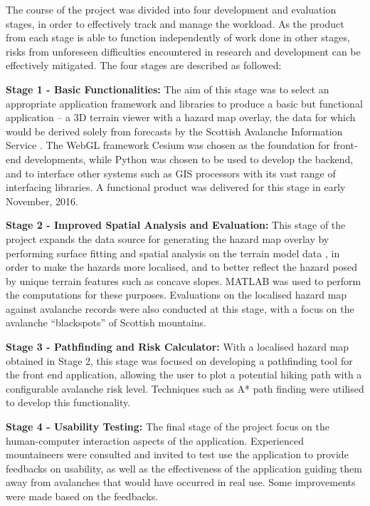 \documentclass[openany]{UoYCSproject}
\begin{document}
The course of the project was divided into four development and evaluation stages, in order to effectively track and manage the workload. As the product from each stage is able to function independently of work done in other stages, risks from unforeseen difficulties encountered in research and development can be effectively mitigated. The four stages are described as followed:

\textbf{Stage 1 - Basic Functionalities:} The aim of this stage was to select an appropriate application framework and libraries to produce a basic but functional application -- a 3D terrain viewer with a hazard map overlay, the data for which would be derived solely from forecasts by the Scottish Avalanche Information Service \cite{sais}. The WebGL framework Cesium \cite{cesium} was chosen as the foundation for front-end developments, while Python was chosen to be used to develop the backend, and to interface other systems such as GIS processors with its vast range of interfacing libraries. A functional product was delivered for this stage in early November, 2016.

\textbf{Stage 2 - Improved Spatial Analysis and Evaluation:} This stage of the project expands the data source for generating the hazard map overlay by performing surface fitting and spatial analysis on the terrain model data \cite{os-5}, in order to make the hazards more localised, and to better reflect the hazard posed by unique terrain features such as concave slopes. MATLAB \cite{matlab-primer} was used to perform the computations for these purposes. Evaluations on the localised hazard map against avalanche records were also conducted at this stage, with a focus on the avalanche ``blackspots'' of Scottish mountains.

\textbf{Stage 3 - Pathfinding and Risk Calculator:} With a localised hazard map obtained in Stage 2, this stage was focused on developing a pathfinding tool for the front end application, allowing the user to plot a potential hiking path with a configurable avalanche risk level. Techniques such as A* path finding \cite{cui2011based} were utilised to develop this functionality. 

\textbf{Stage 4 - Usability Testing:} The final stage of the project focus on the human-computer interaction aspects of the application. Experienced mountaineers were consulted and invited to test use the application to provide feedbacks on usability, as well as the effectiveness of the application guiding them away from avalanches that would have occurred in real use. Some improvements were made based on the feedbacks.
\end{document}
